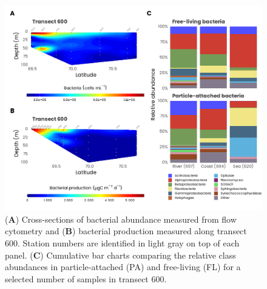 \documentclass[essd, manuscript]{copernicus}
\begin{document}
\clearpage

\begin{figure}[H]
    \centering
    \includegraphics[scale = 1]{../../../graphs/fig14.pdf}
    \caption{(\textbf{A}) Cross-sections of bacterial abundance measured from flow cytometry and (\textbf{B}) bacterial production measured along transect 600. Station numbers are identified in light gray on top of each panel. (\textbf{C}) Cumulative bar charts comparing the relative class abundances in particle-attached (PA) and free-living (FL) for a selected number of samples in transect 600.}
\end{figure}



\appendix


\noappendix       %


\end{document}
